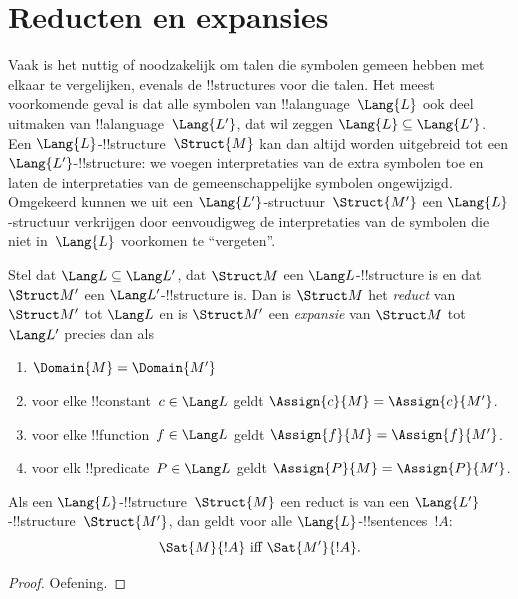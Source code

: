 \documentclass[openany]{memoir}
\begin{document}
\section{Reducten en expansies}

Vaak is het nuttig of noodzakelijk om talen die symbolen gemeen hebben
met elkaar te vergelijken, evenals de !!{structure}s voor die talen.
Het meest voorkomende geval is dat alle symbolen van
!!a{language}~$\Lang{L}$ ook deel uitmaken van
!!a{language}~$\Lang{L'}$, dat wil zeggen $\Lang{L} \subseteq
\Lang{L'}$. Een $\Lang{L}$-!!{structure}~$\Struct{M}$ kan dan altijd
worden uitgebreid tot een $\Lang{L'}$-!!{structure}: we voegen
interpretaties van de extra symbolen toe en laten de interpretaties van
de gemeenschappelijke symbolen ongewijzigd. Omgekeerd kunnen we uit een
$\Lang{L'}$-structuur~$\Struct{M'}$ een $\Lang{L}$-structuur verkrijgen
door eenvoudigweg de interpretaties van de symbolen die niet
in~$\Lang{L}$ voorkomen te ``vergeten''.

\begin{defn}
Stel dat $\Lang L \subseteq \Lang L'$, dat $\Struct M$ een
$\Lang L$-!!{structure} is en dat $\Struct M'$ een
$\Lang L'$-!!{structure} is. Dan is $\Struct M$ het \emph{reduct} van
$\Struct M'$ tot $\Lang L$ en is $\Struct M'$ een \emph{expansie} van
$\Struct M$ tot $\Lang L'$ precies dan als
\begin{enumerate}
\item $\Domain{M} = \Domain{M'}$
\item voor elke !!{constant}~$c \in \Lang L$ geldt $\Assign{c}{M} =
  \Assign{c}{M'}$.
\item voor elke !!{function}~$f \in \Lang L$ geldt $\Assign{f}{M} =
  \Assign{f}{M'}$.
\item voor elk !!{predicate}~$P \in \Lang L$ geldt $\Assign{P}{M} =
  \Assign{P}{M'}$.
\end{enumerate}
\end{defn}

\begin{prop}
Als een $\Lang{L}$-!!{structure}~$\Struct{M}$ een reduct is van een
$\Lang{L'}$-!!{structure}~$\Struct{M'}$, dan geldt voor alle
$\Lang{L}$-!!{sentence}s~$!A$:
\[
\Sat{M}{!A} \text{ iff } \Sat{M'}{!A}.
\]
\end{prop}

\begin{proof}
  Oefening.
\end{proof}
\end{document}
